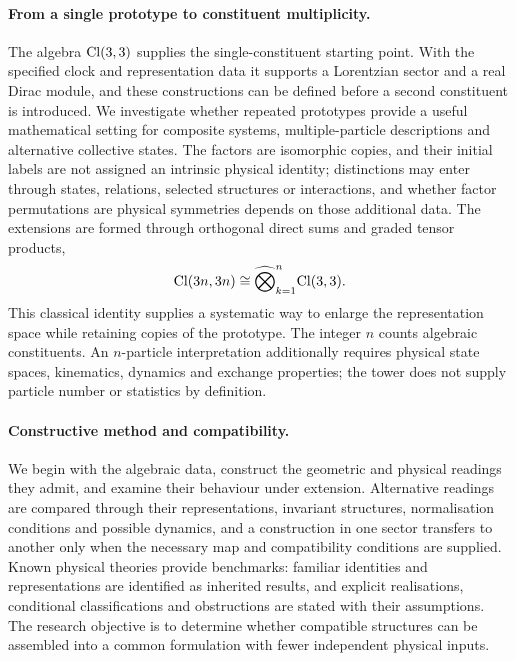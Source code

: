 \paragraph{From a single prototype to constituent multiplicity.} The algebra $\mathrm{Cl}(3,3)$ supplies the single-constituent starting point. With
the specified clock and representation data it supports a Lorentzian sector and a real Dirac module, and these constructions can be defined
before a second constituent is introduced. We investigate whether repeated prototypes provide a useful mathematical setting for composite
systems, multiple-particle descriptions and alternative collective states. The factors are isomorphic copies, and their initial labels are
not assigned an intrinsic physical identity; distinctions may enter through states, relations, selected structures or interactions, and
whether factor permutations are physical symmetries depends on those additional data. The extensions are formed through orthogonal direct
sums and graded tensor products,
\[
\mathrm{Cl}(3n,3n)\cong\widehat{\bigotimes}_{k=1}^{n}\mathrm{Cl}(3,3).
\]
This classical identity supplies a systematic way to enlarge the representation space while retaining copies of the prototype. The integer
$n$ counts algebraic constituents. An $n$-particle interpretation additionally requires physical state spaces, kinematics, dynamics and
exchange properties; the tower does not supply particle number or statistics by definition.

\paragraph{Constructive method and compatibility.} We begin with the algebraic data, construct the geometric and physical readings they
admit, and examine their behaviour under extension. Alternative readings are compared through their representations, invariant
structures, normalisation conditions and possible dynamics, and a construction in one sector transfers to another only when the necessary
map and compatibility conditions are supplied. Known physical theories provide benchmarks: familiar identities and representations are
identified as inherited results, and explicit realisations, conditional classifications and obstructions are stated with their
assumptions. The research objective is to determine whether compatible structures can be assembled into a common formulation with fewer
independent physical inputs.

